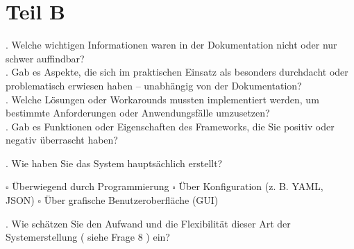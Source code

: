 \documentclass{article}
\begin{document}
\noindent
{}

\section*{Teil B}

\noindent
{}

. Welche wichtigen Informationen waren in der Dokumentation nicht oder nur schwer
auffindbar? \\

. Gab es Aspekte, die sich im praktischen Einsatz als besonders durchdacht oder
problematisch erwiesen haben – unabhängig von der Dokumentation? \\

. Welche Lösungen oder Workarounds mussten implementiert werden, um bestimmte
Anforderungen oder Anwendungsfälle umzusetzen? \\

. Gab es Funktionen oder Eigenschaften des Frameworks, die Sie positiv oder negativ
überrascht haben? \\

\noindent
{}

\noindent
{}

. Wie haben Sie das System hauptsächlich erstellt?
\begin{flushleft}
    $\square$ Überwiegend durch Programmierung \quad
    $\square$ Über Konfiguration (z. B. YAML, JSON) \quad
    $\square$ Über grafische Benutzeroberfläche (GUI) \quad
\end{flushleft}

. Wie schätzen Sie den Aufwand und die Flexibilität dieser Art der Systemerstellung
( siehe Frage 8 ) ein?
\end{document}
